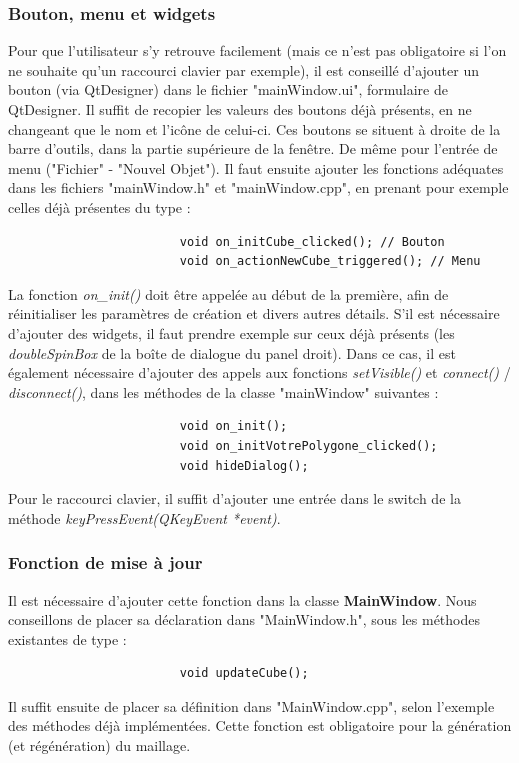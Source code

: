 \documentclass[a4paper]{memoir}
\begin{document}
				\subsubsection{Bouton, menu et widgets}
					Pour que l'utilisateur s'y retrouve facilement (mais ce n'est pas obligatoire si l'on ne souhaite qu'un raccourci clavier par exemple), 
					il est conseillé d'ajouter un bouton (via QtDesigner) dans le fichier "mainWindow.ui", formulaire de QtDesigner. Il suffit de recopier 
					les valeurs des boutons déjà présents, en ne changeant que le nom et l'icône de celui-ci. Ces boutons se situent à droite de la barre 
					d'outils, dans la partie supérieure de la fenêtre. De même pour l'entrée de menu ("Fichier" - "Nouvel Objet"). Il faut ensuite ajouter 
					les fonctions adéquates dans les fichiers "mainWindow.h" et "mainWindow.cpp", en prenant pour exemple celles déjà présentes du type :
					\begin{verbatim}
						void on_initCube_clicked(); // Bouton
						void on_actionNewCube_triggered(); // Menu
					\end{verbatim}
					La fonction \textit{on\_init()} doit être appelée au début de la première, afin de réinitialiser les paramètres de création et divers 
					autres détails. S'il est nécessaire d'ajouter des widgets, il faut prendre exemple sur ceux déjà présents (les \textit{doubleSpinBox} 
					de la boîte de dialogue du panel droit). Dans ce cas, il est également nécessaire d'ajouter des appels aux fonctions 
					\textit{setVisible()} et \textit{connect()} / \textit{disconnect()}, dans les méthodes de la classe "mainWindow" suivantes :
					\begin{verbatim}
						void on_init();
						void on_initVotrePolygone_clicked();
						void hideDialog();
					\end{verbatim}
					Pour le raccourci clavier, il suffit d'ajouter une entrée dans le switch de la méthode \textit{keyPressEvent(QKeyEvent *event)}.
					
				\subsubsection{Fonction de mise à jour}
					Il est nécessaire d'ajouter cette fonction dans la classe \textbf{MainWindow}. Nous conseillons de placer sa déclaration dans 
					"MainWindow.h", sous les méthodes existantes de type :
					\begin{verbatim}
						void updateCube();
					\end{verbatim}
					Il suffit ensuite de placer sa définition dans "MainWindow.cpp", selon l'exemple des méthodes déjà implémentées. Cette fonction est 
					obligatoire pour la génération (et régénération) du maillage.
				
\end{document}
